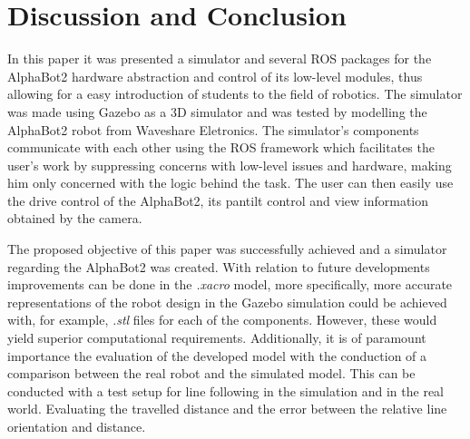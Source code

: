 \documentclass[conference]{IEEEtran}
\begin{document}
\section{Discussion and Conclusion}\label{sec:discussion&conclusions}

In this paper it was presented a simulator and several ROS packages for the AlphaBot2 hardware abstraction and control of its low-level modules, thus allowing for a easy introduction of students to the field of robotics. The simulator was made using Gazebo as a 3D simulator and was tested by modelling the AlphaBot2 robot from Waveshare Eletronics. The simulator's components communicate with each other using the ROS framework which facilitates the user's work by suppressing concerns with low-level issues and hardware, making him only concerned with the logic behind the task. The user can then easily use the drive control of the AlphaBot2, its pantilt control and view information obtained by the camera.

The proposed objective of this paper was successfully achieved and a simulator regarding the AlphaBot2 was created. With relation to future developments improvements can be done in the \textit{.xacro} model, more specifically, more accurate representations of the robot design in the Gazebo simulation could be achieved with, for example, \textit{.stl} files for each of the components. However, these would yield superior computational requirements. 
Additionally, it is of paramount importance the evaluation of the developed model with the conduction of a comparison between the real robot and the simulated model. This can be conducted with a test setup for line following in the simulation and in the real world. Evaluating the travelled distance and the error between the relative line orientation and distance.

\printbibliography

\vspace{12pt}
\end{document}
